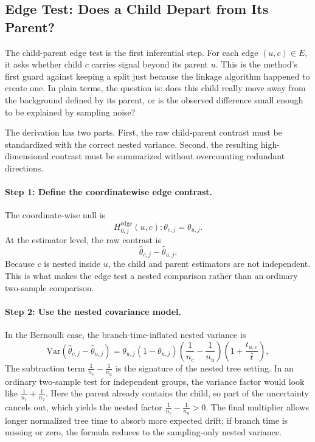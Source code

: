 
\subsection{Edge Test: Does a Child Depart from Its Parent?}

The child-parent edge test is the first inferential step. For each edge
$(u,c) \in E$, it asks whether child $c$ carries signal beyond its parent $u$.
This is the method's first guard against keeping a split just because the
linkage algorithm happened to create one. In plain terms, the question is:
does this child really move away from the background defined by its parent, or
is the observed difference small enough to be explained by sampling noise?

The derivation has two parts. First, the raw child-parent contrast must be
standardized with the correct nested variance. Second, the resulting
high-dimensional contrast must be summarized without overcounting redundant
directions.

\paragraph{Step 1: Define the coordinatewise edge contrast.}
The coordinate-wise null is
\begin{equation}
H_{0,j}^{\mathrm{edge}}(u,c): \theta_{c,j} = \theta_{u,j}.
\end{equation}
At the estimator level, the raw contrast is
\begin{equation}
\hat{\theta}_{c,j} - \hat{\theta}_{u,j}.
\end{equation}
Because $c$ is nested inside $u$, the child and parent estimators are not
independent. This is what makes the edge test a nested comparison rather than
an ordinary two-sample comparison.

\paragraph{Step 2: Use the nested covariance model.}
In the Bernoulli case, the branch-time-inflated nested variance is
\begin{equation}
\mathrm{Var}(\hat{\theta}_{c,j} - \hat{\theta}_{u,j})
=
\theta_{u,j}(1-\theta_{u,j})
\left(\frac{1}{n_c} - \frac{1}{n_u}\right)
\left(1+\frac{t_{u,c}}{\bar t}\right),
\end{equation}
The subtraction term
$\frac{1}{n_c} - \frac{1}{n_u}$ is the signature of the nested tree setting.
In an ordinary two-sample test for independent groups, the variance factor
would look like $\frac{1}{n_1} + \frac{1}{n_2}$. Here the parent already
contains the child, so part of the uncertainty cancels out, which yields the
nested factor $\frac{1}{n_c} - \frac{1}{n_u} > 0$. The final multiplier allows
longer normalized tree time to absorb more expected drift; if branch time is
missing or zero, the formula reduces to the sampling-only nested variance.

